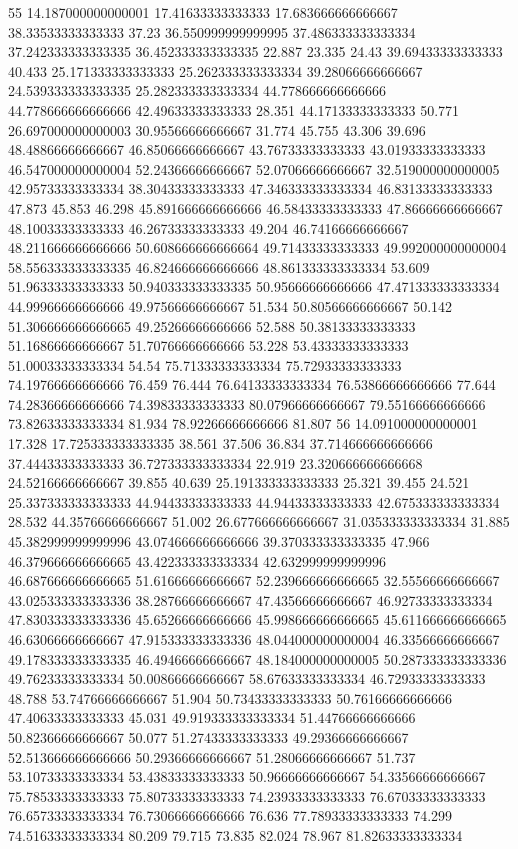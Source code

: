 55 14.187000000000001 17.41633333333333 17.683666666666667 38.33533333333333 37.23 36.550999999999995 37.486333333333334 37.242333333333335 36.452333333333335 22.887 23.335 24.43 39.69433333333333 40.433 25.171333333333333 25.262333333333334 39.28066666666667 24.539333333333335 25.282333333333334 44.778666666666666 44.778666666666666 42.49633333333333 28.351 44.17133333333333 50.771 26.697000000000003 30.95566666666667 31.774 45.755 43.306 39.696 48.48866666666667 46.85066666666667 43.76733333333333 43.01933333333333 46.547000000000004 52.24366666666667 52.07066666666667 32.519000000000005 42.95733333333334 38.30433333333333 47.346333333333334 46.83133333333333 47.873 45.853 46.298 45.891666666666666 46.58433333333333 47.86666666666667 48.10033333333333 46.26733333333333 49.204 46.74166666666667 48.211666666666666 50.608666666666664 49.71433333333333 49.992000000000004 58.556333333333335 46.824666666666666 48.861333333333334 53.609 51.96333333333333 50.940333333333335 50.95666666666666 47.471333333333334 44.99966666666666 49.97566666666667 51.534 50.80566666666667 50.142 51.306666666666665 49.25266666666666 52.588 50.38133333333333 51.16866666666667 51.70766666666666 53.228 53.43333333333333 51.00033333333334 54.54 75.71333333333334 75.72933333333333 74.19766666666666 76.459 76.444 76.64133333333334 76.53866666666666 77.644 74.28366666666666 74.39833333333333 80.07966666666667 79.55166666666666 73.82633333333334 81.934 78.92266666666666 81.807
56 14.091000000000001 17.328 17.725333333333335 38.561 37.506 36.834 37.714666666666666 37.44433333333333 36.727333333333334 22.919 23.320666666666668 24.52166666666667 39.855 40.639 25.191333333333333 25.321 39.455 24.521 25.337333333333333 44.94433333333333 44.94433333333333 42.675333333333334 28.532 44.35766666666667 51.002 26.677666666666667 31.035333333333334 31.885 45.382999999999996 43.074666666666666 39.370333333333335 47.966 46.379666666666665 43.422333333333334 42.632999999999996 46.687666666666665 51.61666666666667 52.239666666666665 32.55566666666667 43.025333333333336 38.28766666666667 47.43566666666667 46.92733333333334 47.830333333333336 45.65266666666666 45.998666666666665 45.611666666666665 46.63066666666667 47.915333333333336 48.044000000000004 46.33566666666667 49.178333333333335 46.49466666666667 48.184000000000005 50.287333333333336 49.76233333333334 50.00866666666667 58.67633333333334 46.72933333333333 48.788 53.74766666666667 51.904 50.73433333333333 50.76166666666666 47.40633333333333 45.031 49.919333333333334 51.44766666666666 50.82366666666667 50.077 51.27433333333333 49.29366666666667 52.513666666666666 50.29366666666667 51.28066666666667 51.737 53.10733333333334 53.43833333333333 50.96666666666667 54.33566666666667 75.78533333333333 75.80733333333333 74.23933333333333 76.67033333333333 76.65733333333334 76.73066666666666 76.636 77.78933333333333 74.299 74.51633333333334 80.209 79.715 73.835 82.024 78.967 81.82633333333334
